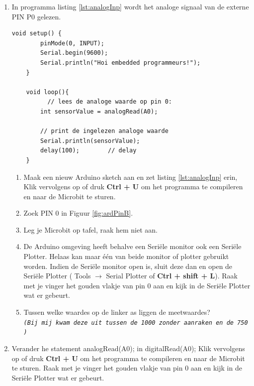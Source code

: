 \begin{enumerate}
\item In programma listing \ref{lst:analogInp} wordt het analoge signaal van de externe PIN P0 gelezen.
\begin{lstlisting}[numbers=none ,caption= inlezen via een analoog signaal.,label={lst:analogInp}]
	void setup() {  
		pinMode(0, INPUT); 
		Serial.begin(9600);
		Serial.println("Hoi embedded programmeurs!");
	}
	
	void loop(){
          // lees de analoge waarde op pin 0:
        int sensorValue = analogRead(A0);
        
        // print de ingelezen analoge waarde
        Serial.println(sensorValue);
        delay(100);        // delay 
	}

\end{lstlisting}
\begin{enumerate}
	\item  Maak een nieuw Arduino sketch aan en zet listing \ref{lst:analogInp} erin, Klik vervolgens op  of druk \colorbox{mygray}{\textbf{Ctrl + U}} om het programma te compileren en naar de Microbit te sturen. 
\item Zoek PIN 0 in Figuur \ref{fig:ardPinB}.
\item Leg je Microbit op tafel, raak hem niet aan. 
\item De Arduino omgeving heeft behalve een Seriële monitor ook een Seriële Plotter. Helaas kan maar één van beide monitor of plotter gebruikt worden. 
Indien de Seriële monitor open is, sluit deze dan en open de Seriële Plotter ( Tools $\rightarrow$ Serial Plotter of \colorbox{mygray}{\textbf{Ctrl + shift + L}}).
Raak met je vinger het gouden vlakje van pin 0 aan en kijk in de Seriële Plotter wat er gebeurt.
\item Tussen welke waardes op de linker as liggen de meetwaardes? \hrulefill \\	
 \footnotesize{\texttt{\textit{(Bij mij kwam deze uit tussen de 1000 zonder aanraken en de 750 )}} }
	
\end{enumerate}


\item Verander he statement  \textcolor{arduinoOrange}{analogRead}(A0); in \textcolor{arduinoOrange}{digitalRead}(A0); Klik vervolgens op  of druk \colorbox{mygray}{\textbf{Ctrl + U}} om het programma te compileren en naar de Microbit te sturen. Raak met je vinger het gouden vlakje van pin 0 aan en kijk in de Seriële Plotter wat er gebeurt. 


\end{enumerate}

